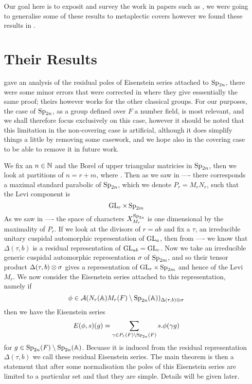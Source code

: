 Our goal here is to exposit and survey the work in papers such as \cite{brennerNotesAnalyticProperties2009}\cite{jiangPolesCertainResidual2013}, we were going to generalise some of these results to metaplectic covers however we found these results in \cite{ginzburgTopFourierCoefficients2021}.

\section{Their Results}
\cite{brennerNotesAnalyticProperties2009} gave an analysis of the residual poles of Eisenstein series attached to \(\operatorname{Sp}_{2n}\), there were some minor errors that were corrected in \cite{jiangPolesCertainResidual2013} where they give esssentially the same proof; theirs however works for the other classical groups. For our purposes, the case of \(\operatorname{Sp}_{2n}\), as a group defined over \(F\) a number field, is most relevant, and we shall therefore focus exclusively on this case, however it should be noted that this limitation in the non-covering case is artificial, although it does simplify things a little by removing some casework, and we hope also in the covering case to be able to remove it in future work. 

We fix an \(n\in \N\) and the Borel of upper triangular matricies in \(\operatorname{Sp}_{2n} \), then we look at partitions of \(n = r + m\), where . Then as we saw in  ---- there corresponds a maximal standard parabolic of \(\operatorname{Sp}_{2n}\), which we denote \(P_r = M_rN_r\), such that the Levi component is 
\[\operatorname{GL}_r\times \operatorname{Sp}_{2m} \]
As we saw in ---- the space of characters \(X^{\operatorname{Sp}_{2n}}_{M_r}\) is one dimensional by the maximality of \(P_r\). If we look at the divisors of \(r = ab\)  and fix a \(\tau\), an irreducible unitary cuspidal automorphic representation of \(\operatorname{GL}_a\), then from  ---- we know that \(\Delta(\tau, b)\) is a residual representation of \(\operatorname{GL}_{ab} = \operatorname{GL}_r\). Now we take an irreducible generic cuspidal automorphic representation \(\sigma\) of \(\operatorname{Sp}_{2m}\), and so their tensor product \(\Delta(\tau, b) \otimes \sigma\) gives a representation of \(\operatorname{GL}_{r}\times \operatorname{Sp}_{2m}\) and hence of the Levi \(M_r\). We now consider the Eisenstein series attached to this representation, namely if 
\[\phi\in \mathcal{A}(N_r(\A)M_r(F)\setminus \Sp_{2n}(\A) )_{\Delta(\tau, b)\tensor \sigma}\] 
then we have the Eisenstein series
\[E(\phi, s)(g) = \sum_{\gamma\in P_r(F) \setminus \Sp_{2n}(F)} s.\phi(\gamma g)\]
for \(g\in \Sp_{2n}(F) \setminus \Sp_{2n}(\A)\). Becuase it is induced from the residual representation \(\Delta(\tau, b)\) we call these residual Eisenstein series. The main theorem is then a statement that after some normalisation the poles of this Eisenstein series are limited to a particular set and that they are simple. Details will be given later.


